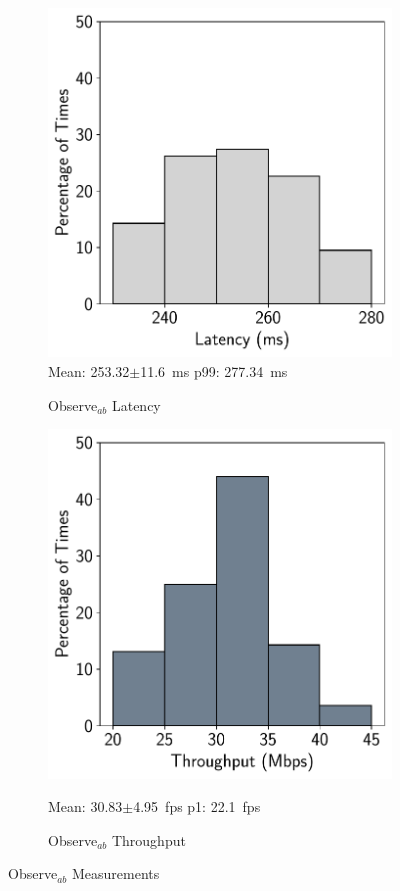 \begin{figure}[htbp]
    \centering
    \begin{subfigure}[t]{0.45\textwidth}
    \centering
    \includegraphics[width = .8\textwidth]{figs/observe-ab-latency.pdf}\\
    \small{Mean: 253.32$\pm$11.6~ms\; p99: 277.34~ms}\\
    \caption{Observe$_{ab}$ Latency}
    \label{fig:observe_ab_latency}
\end{subfigure}
\begin{subfigure}[t]{0.45\textwidth}
    \centerline{\includegraphics[width = .8\textwidth]{figs/observe-ab-throughput.pdf}}
    \centering
    \small{Mean: 30.83$\pm$4.95~fps\; p1: 22.1~fps}\\
    \caption{Observe$_{ab}$ Throughput}
    \label{fig:observe_ab_throughput}
\end{subfigure}
    \caption{Observe$_{ab}$ Measurements}
    \label{fig:observe_ab_measurements}
\end{figure}

